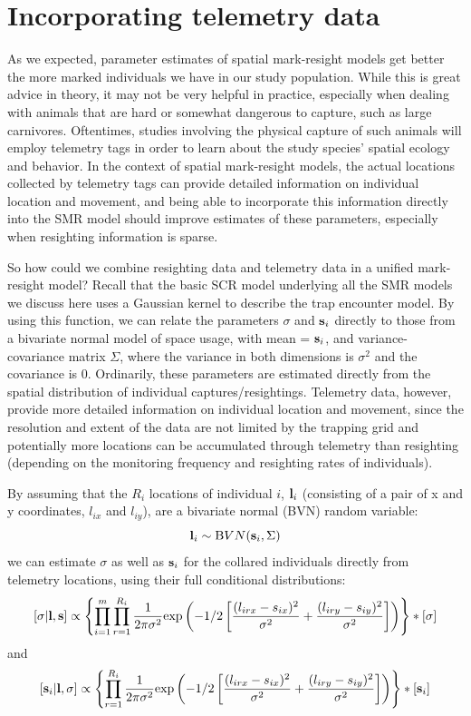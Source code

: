 \section{Incorporating telemetry data}
\label{partialID.sec.telemetry}
As we expected, parameter estimates of spatial mark-resight models get
better the more marked individuals we have in our study
population. While this is great advice in theory, it may not be very
helpful in practice, especially when dealing with animals that are
hard or somewhat dangerous to capture, such as large
carnivores. Oftentimes, studies involving the physical capture of such
animals will employ telemetry tags in order to learn about the study
species' spatial ecology and behavior. In the context of spatial
mark-resight models, the actual locations
collected by telemetry tags can provide detailed information on individual location and movement, and being able to incorporate this information directly into the SMR model should improve estimates of these parameters, especially when resighting information is sparse.

So how could we combine resighting data and telemetry data in a unified mark-resight model? Recall that the basic SCR model underlying all the SMR models we discuss here uses a Gaussian kernel 
to describe the trap encounter model.
By using this function, we can relate the parameters $\sigma$ and ${\bf s}_{i}$ directly to those from a bivariate normal model of space usage, with mean = ${\bf s}_{i}$, and variance-covariance matrix $\Sigma$, where the variance in both dimensions is $\sigma^2$ and the covariance is 0. Ordinarily, these parameters are estimated directly from the spatial distribution of individual captures/resightings. Telemetry data, however, provide more detailed information on individual location and movement, since the resolution and extent of the data are not limited by the trapping grid and potentially more locations can be accumulated through telemetry than resighting (depending on the monitoring frequency and resighting rates of individuals).

By assuming that the $R_i$ locations of individual $i$, ${\bf l}_{i}$ (consisting of a pair of x and y coordinates, $l_{ix}$ and $l_{iy}$), are a bivariate normal (BVN) random variable:
\[
{\bf l}_i\sim {\mbox BVN} ({\bf s}_i,\Sigma)
\]
we can estimate $\sigma$ as well as ${\bf s}_{i}$ for the collared individuals directly from telemetry locations, using their full conditional distributions:
\[
[\sigma|{\bf l},{\bf s}] \propto \left\{\prod_{i=1}^m \prod_{r=1}^{R_{i}} \frac{1}{2 \pi \sigma^2} {\exp}\left(-1/2 \left[ \frac {(l_{irx}-s_{ix})^2} {\sigma^2} + \frac{(l_{iry}-s_{iy})^2}{\sigma^2} \right]\right)\right\}*[\sigma]
\]
and
\[
[{\bf s}_i|{\bf l},\sigma] \propto \left\{\prod_{r=1}^{R_{i}} \frac{1}{2 \pi \sigma^2} {\exp}\left(-1/2 \left[ \frac {(l_{irx}-s_{ix})^2} {\sigma^2} + \frac{(l_{iry}-s_{iy})^2}{\sigma^2} \right]\right)\right\}*[{\bf s}_{i}]
\]


